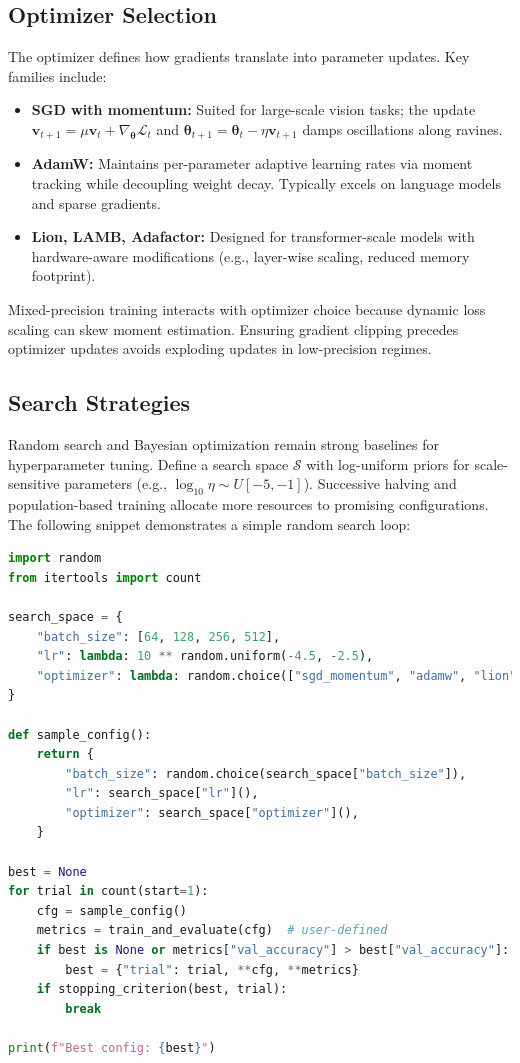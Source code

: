 \documentclass{article}
\begin{document}
\subsection{Optimizer Selection}
The optimizer defines how gradients translate into parameter updates. Key families include:
\begin{itemize}
  \item \textbf{SGD with momentum:} Suited for large-scale vision tasks; the update $\mathbf{v}_{t+1} = \mu \mathbf{v}_{t} + \nabla_{\boldsymbol{\theta}} \mathcal{L}_t$ and $\boldsymbol{\theta}_{t+1} = \boldsymbol{\theta}_t - \eta \mathbf{v}_{t+1}$ damps oscillations along ravines.
  \item \textbf{AdamW:} Maintains per-parameter adaptive learning rates via moment tracking while decoupling weight decay. Typically excels on language models and sparse gradients.
  \item \textbf{Lion, LAMB, Adafactor:} Designed for transformer-scale models with hardware-aware modifications (e.g., layer-wise scaling, reduced memory footprint).
\end{itemize}
Mixed-precision training interacts with optimizer choice because dynamic loss scaling can skew moment estimation. Ensuring gradient clipping precedes optimizer updates avoids exploding updates in low-precision regimes.

\subsection{Search Strategies}
Random search and Bayesian optimization remain strong baselines for hyperparameter tuning. Define a search space $\mathcal{S}$ with log-uniform priors for scale-sensitive parameters (e.g., $\log_{10} \eta \sim U[-5, -1]$). Successive halving and population-based training allocate more resources to promising configurations. The following snippet demonstrates a simple random search loop:

\begin{lstlisting}[language=Python, caption={Random search over batch size, learning rate, and optimizer family.}]
import random
from itertools import count

search_space = {
    "batch_size": [64, 128, 256, 512],
    "lr": lambda: 10 ** random.uniform(-4.5, -2.5),
    "optimizer": lambda: random.choice(["sgd_momentum", "adamw", "lion"]),
}

def sample_config():
    return {
        "batch_size": random.choice(search_space["batch_size"]),
        "lr": search_space["lr"](),
        "optimizer": search_space["optimizer"](),
    }

best = None
for trial in count(start=1):
    cfg = sample_config()
    metrics = train_and_evaluate(cfg)  # user-defined
    if best is None or metrics["val_accuracy"] > best["val_accuracy"]:
        best = {"trial": trial, **cfg, **metrics}
    if stopping_criterion(best, trial):
        break

print(f"Best config: {best}")
\end{lstlisting}
\end{document}
